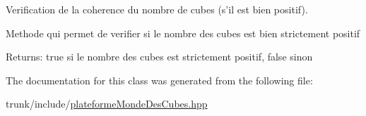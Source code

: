 Verification de la coherence du nombre de cubes (s'il est bien positif). 

Methode qui permet de verifier si le nombre des cubes est bien strictement positif

\begin{Desc}
\item[Returns:]true si le nombre des cubes est strictement positif, false sinon \end{Desc}


The documentation for this class was generated from the following file:\begin{CompactItemize}
\item 
trunk/include/\hyperlink{plateformeMondeDesCubes_8hpp}{plateformeMondeDesCubes.hpp}\end{CompactItemize}
